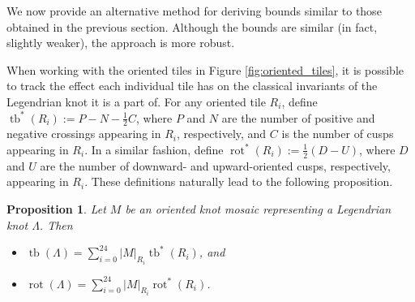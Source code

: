 \documentclass{article}
\DeclareMathOperator{\tb}{tb}
\DeclareMathOperator{\rot}{rot}
\newtheorem{prop}{Proposition}
\begin{document}
 We now provide an alternative method for deriving bounds similar to those obtained in the previous section.
 Although the bounds are similar (in fact, slightly weaker), the approach is more robust. %


When working with the oriented tiles in Figure \ref{fig:oriented_tiles}, it is possible to track the effect each individual tile has on the classical invariants of the Legendrian knot it is a part of. For any oriented tile $R_i$, define $\tb^*(R_i) := P-N-\frac{1}{2}C$, where $P$ and $N$ are the number of positive and negative crossings appearing in $R_i$, respectively, and $C$ is the number of cusps appearing in $R_i$. In a similar fashion, define $\rot^*(R_i) := \frac{1}{2}(D-U)$, where $D$ and $U$ are the number of downward- and upward-oriented cusps, respectively, appearing in $R_i$. These definitions naturally lead to the following proposition. 


\begin{prop}\label{prop:classical_sum}
    Let $M$ be an oriented knot mosaic representing a Legendrian knot $\Lambda$. Then
    \begin{itemize}
        \item[i.] $\tb(\Lambda)=\sum_{i=0}^{24}|M|_{R_i}\tb^*(R_i)$, and
        \item[ii.] $\rot(\Lambda)=\sum_{i=0}^{24}|M|_{R_i}\rot^*(R_i)$.
    \end{itemize}
\end{prop}

\end{document}
